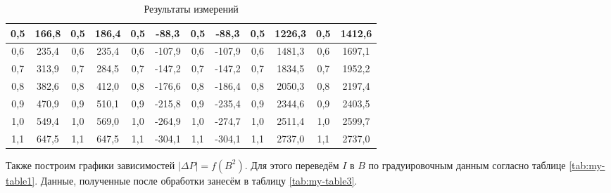 \documentclass[a4paper,12pt]{article} %
\begin{document}
\begin{table}[H]
{\begin{tabular}{|cccc|cccc|cccc|}
			\multicolumn{1}{|c|}{0,5} & \multicolumn{1}{c|}{166,8} & \multicolumn{1}{c|}{0,5} & 186,4 & \multicolumn{1}{c|}{0,5} & \multicolumn{1}{c|}{-88,3}  & \multicolumn{1}{c|}{0,5} & -88,3  & \multicolumn{1}{c|}{0,5} & \multicolumn{1}{c|}{1226,3} & \multicolumn{1}{c|}{0,5} & 1412,6 \\ \hline
			\multicolumn{1}{|c|}{0,6} & \multicolumn{1}{c|}{235,4} & \multicolumn{1}{c|}{0,6} & 235,4 & \multicolumn{1}{c|}{0,6} & \multicolumn{1}{c|}{-107,9} & \multicolumn{1}{c|}{0,6} & -107,9 & \multicolumn{1}{c|}{0,6} & \multicolumn{1}{c|}{1481,3} & \multicolumn{1}{c|}{0,6} & 1697,1 \\ \hline
			\multicolumn{1}{|c|}{0,7} & \multicolumn{1}{c|}{313,9} & \multicolumn{1}{c|}{0,7} & 284,5 & \multicolumn{1}{c|}{0,7} & \multicolumn{1}{c|}{-147,2} & \multicolumn{1}{c|}{0,7} & -147,2 & \multicolumn{1}{c|}{0,7} & \multicolumn{1}{c|}{1834,5} & \multicolumn{1}{c|}{0,7} & 1952,2 \\ \hline
			\multicolumn{1}{|c|}{0,8} & \multicolumn{1}{c|}{382,6} & \multicolumn{1}{c|}{0,8} & 412,0 & \multicolumn{1}{c|}{0,8} & \multicolumn{1}{c|}{-176,6} & \multicolumn{1}{c|}{0,8} & -186,4 & \multicolumn{1}{c|}{0,8} & \multicolumn{1}{c|}{2050,3} & \multicolumn{1}{c|}{0,8} & 2197,4 \\ \hline
			\multicolumn{1}{|c|}{0,9} & \multicolumn{1}{c|}{470,9} & \multicolumn{1}{c|}{0,9} & 510,1 & \multicolumn{1}{c|}{0,9} & \multicolumn{1}{c|}{-215,8} & \multicolumn{1}{c|}{0,9} & -235,4 & \multicolumn{1}{c|}{0,9} & \multicolumn{1}{c|}{2344,6} & \multicolumn{1}{c|}{0,9} & 2403,5 \\ \hline
			\multicolumn{1}{|c|}{1,0} & \multicolumn{1}{c|}{549,4} & \multicolumn{1}{c|}{1,0} & 569,0 & \multicolumn{1}{c|}{1,0} & \multicolumn{1}{c|}{-264,9} & \multicolumn{1}{c|}{1,0} & -274,7 & \multicolumn{1}{c|}{1,0} & \multicolumn{1}{c|}{2511,4} & \multicolumn{1}{c|}{1,0} & 2599,7 \\ \hline
			\multicolumn{1}{|c|}{1,1} & \multicolumn{1}{c|}{647,5} & \multicolumn{1}{c|}{1,1} & 647,5 & \multicolumn{1}{c|}{1,1} & \multicolumn{1}{c|}{-304,1} & \multicolumn{1}{c|}{1,1} & -304,1 & \multicolumn{1}{c|}{1,1} & \multicolumn{1}{c|}{2737,0} & \multicolumn{1}{c|}{1,1} & 2737,0 \\ \hline
		\end{tabular}%
	}
	\caption{Результаты измерений}
	\label{tab:my-table2}
\end{table}

Также построим графики зависимостей $ |\Delta P| = f(B^2) $. Для этого переведём $ I $ в $ B $ по градуировочным данным согласно таблице \ref{tab:my-table1}. Данные, полученные после обработки занесём в таблицу \ref{tab:my-table3}.
\end{document}
